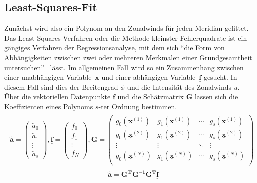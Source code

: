 \subsection{Least-Squares-Fit}
Zunächst wird also ein Polynom an den Zonalwinds für jeden Meridian gefittet. Das Least-Squares-Verfahren oder die Methode kleinster Fehlerquadrate ist ein gängiges Verfahren der Regressionsanalyse, mit dem sich \enquote{die Form von Abhängigkeiten zwischen zwei  oder mehreren Merkmalen einer Grundgesamtheit untersuchen}~\citep{bronstein-2006} lässt. Im allgemeinen Fall wird so ein Zusammenhang zwischen einer unabhängigen Variable~$\underline{\boldsymbol{x}}$ und einer abhängigen Variable~$\underline{\boldsymbol{f}}$ gesucht. In diesem Fall sind dies der Breitengrad $\phi$ und die Intensität des Zonalwinds $u$. Über die vektoriellen Datenpunkte $\underline{\boldsymbol{f}}$ und die Schätzmatrix $\boldsymbol{G}$ lassen sich die Koeffizienten eines Polynoms $s$-ter Ordnung bestimmen.  
\begin{align}
\begin{split}
\underline{\boldsymbol{\tilde{a}}} = 
\begin{pmatrix}
  \tilde{a}_0 \\
  \tilde{a}_1 \\
  \vdots \\
  \tilde{a}_s
\end{pmatrix},
\underline{\boldsymbol{f}} = 
\begin{pmatrix}
  f_0 \\
  f_1 \\
  \vdots \\
  f_N
\end{pmatrix},
\boldsymbol{G} = 
 \begin{pmatrix}
  g_{0} \left( \underline{\boldsymbol{x}}^{\left( 1 \right)} \right) & g_{1} \left( \underline{\boldsymbol{x}}^{\left( 1 \right)} \right) & \cdots & g_{s} \left( \underline{\boldsymbol{x}}^{\left( 1 \right)} \right) \\
  g_{0} \left( \underline{\boldsymbol{x}}^{\left( 2 \right)} \right) & g_{1} \left( \underline{\boldsymbol{x}}^{\left( 2 \right)} \right) & \cdots & g_{s} \left( \underline{\boldsymbol{x}}^{\left( 2 \right)} \right) \\
  \vdots  & \vdots  & \ddots & \vdots  \\
  g_{0} \left( \underline{\boldsymbol{x}}^{\left( N \right)} \right) & g_{1} \left( \underline{\boldsymbol{x}}^{\left( N \right)} \right) & \cdots & g_{s} \left( \underline{\boldsymbol{x}}^{\left( N \right)} \right) \\
 \end{pmatrix}
\end{split}
\end{align}
\begin{align}
& \underline{\boldsymbol{\tilde{a}}} = \boldsymbol{G^TG^{-1}G^T}\underline{\boldsymbol{f}} 
\end{align}

